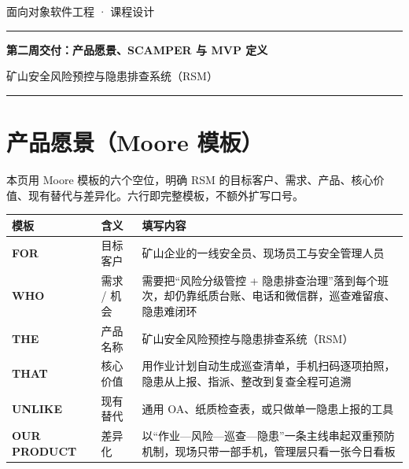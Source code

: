 \documentclass[11pt,a4paper,twoside,fontset=fandol]{ctexart}
\begin{document}
\raggedbottom
\thispagestyle{plain}

\hfill{\sffamily\small\color{black}面向对象软件工程 · 课程设计}\par
\vspace{4pt}\noindent\textcolor{ReportBlue}{\rule{\linewidth}{0.8pt}}\par
\vspace{10pt}
{\centering\heiti\bfseries\fontsize{18}{24}\selectfont 第二周交付：产品愿景、SCAMPER 与 MVP 定义\par}
\vspace{5pt}
{\centering\large 矿山安全风险预控与隐患排查系统（RSM）\par}
\vspace{7pt}
\noindent\textcolor{ReportBlue}{\rule{\linewidth}{0.4pt}}\par
\vspace{6pt}

\section{产品愿景（Moore 模板）}

本页用 Moore 模板的六个空位，明确 RSM 的目标客户、需求、产品、核心价值、现有替代与差异化。六行即完整模板，不额外扩写口号。

\begin{table}[H]
\centering
\small
\renewcommand{\arraystretch}{1.35}
\begin{tabularx}{\linewidth}{@{}>{\raggedright\arraybackslash}p{29mm}>{\raggedright\arraybackslash}p{19mm}X@{}}
\toprule
\textbf{模板} & \textbf{含义} & \textbf{填写内容} \\
\midrule
\textsf{\textbf{FOR}} & 目标客户 & 矿山企业的一线安全员、现场员工与安全管理人员 \\
\textsf{\textbf{WHO}} & 需求 / 机会 & 需要把“风险分级管控 + 隐患排查治理”落到每个班次，却仍靠纸质台账、电话和微信群，巡查难留痕、隐患难闭环 \\
\textsf{\textbf{THE}} & 产品名称 & 矿山安全风险预控与隐患排查系统（RSM） \\
\textsf{\textbf{THAT}} & 核心价值 & 用作业计划自动生成巡查清单，手机扫码逐项拍照，隐患从上报、指派、整改到复查全程可追溯 \\
\textsf{\textbf{UNLIKE}} & 现有替代 & 通用 OA、纸质检查表，或只做单一隐患上报的工具 \\
\textsf{\textbf{OUR PRODUCT}} & 差异化 & 以“作业—风险—巡查—隐患”一条主线串起双重预防机制，现场只带一部手机，管理层只看一张今日看板 \\
\bottomrule
\end{tabularx}
\end{table}
\end{document}
